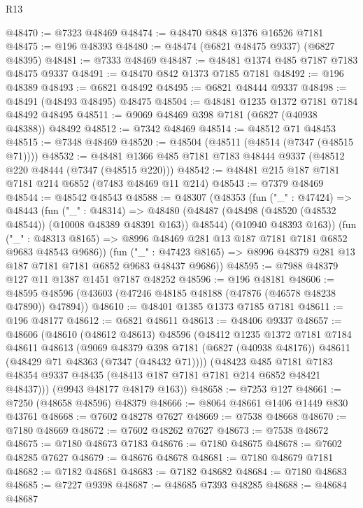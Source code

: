 \begin{lexlean}{R13}
\begin{coremodule}
@48470 := @7323 @48469
@48474 := @48470 @848 @1376 @16526 @7181
@48475 := @196 @48393
@48480 := @48474 (@6821 @48475 @9337) (@6827 @48395)
@48481 := @7333 @48469
@48487 := @48481 @1374 @485 @7187 @7183 @48475 @9337
@48491 := @48470 @842 @1373 @7185 @7181
@48492 := @196 @48389
@48493 := @6821 @48492
@48495 := @6821 @48444 @9337
@48498 := @48491 (@48493 @48495) @48475
@48504 := @48481 @1235 @1372 @7181 @7184 @48492 @48495
@48511 := @9069 @48469 @398 @7181 (@6827 (@40938 @48388)) @48492
@48512 := @7342 @48469
@48514 := @48512 @71 @48453
@48515 := @7348 @48469
@48520 := @48504 (@48511 (@48514 (@7347 (@48515 @71))))
@48532 := @48481 @1366 @485 @7181 @7183 @48444 @9337 (@48512 @220 @48444 (@7347 (@48515 @220)))
@48542 := @48481 @215 @187 @7181 @7181 @214 @6852 (@7483 @48469 @11 @214)
@48543 := @7379 @48469
@48544 := @48542 @48543
@48588 := @48307
    (@48353
      (fun ("_" : @47424) =>
      @48443
        (fun ("_" : @48314) =>
        @48480
          (@48487 (@48498 (@48520 (@48532 @48544)) (@10008 @48389 @48391 @163)) @48544)
          (@10940 @48393 @163))
        (fun ("_" : @48313 @8165) =>
        @8996 @48469 @281 @13 @187 @7181 @7181 @6852 @9683 @48543 @9686))
      (fun ("_" : @47423 @8165) => @8996 @48379 @281 @13 @187 @7181 @7181 @6852 @9683 @48437 @9686))
@48595 := @7988 @48379 @127 @11 @1387 @1451 @7187 @48252
@48596 := @196 @48181
@48606 := @48595 @48596 (@43603 (@47246 @48185 @48188 (@47876 (@46578 @48238 @47890)) @47894))
@48610 := @48401 @1385 @1373 @7185 @7181
@48611 := @196 @48177
@48612 := @6821 @48611
@48613 := @48406 @9337
@48657 := @48606
    (@48610
      (@48612 @48613)
      @48596
      (@48412
        @1235
        @1372
        @7181
        @7184
        @48611
        @48613
        (@9069
          @48379
          @398
          @7181
          (@6827 (@40938 @48176))
          @48611
          (@48429 @71 @48363 (@7347 (@48432 @71))))
        (@48423
          @485
          @7181
          @7183
          @48354
          @9337
          @48435
          (@48413 @187 @7181 @7181 @214 @6852 @48421 @48437)))
      (@9943 @48177 @48179 @163))
@48658 := @7253 @127
@48661 := @7250 (@48658 @48596) @48379
@48666 := @8064 @48661 @1406 @1449 @830 @43761
@48668 := @7602 @48278 @7627
@48669 := @7538 @48668
@48670 := @7180 @48669
@48672 := @7602 @48262 @7627
@48673 := @7538 @48672
@48675 := @7180 @48673 @7183
@48676 := @7180 @48675
@48678 := @7602 @48285 @7627
@48679 := @48676 @48678
@48681 := @7180 @48679 @7181
@48682 := @7182 @48681
@48683 := @7182 @48682
@48684 := @7180 @48683
@48685 := @7227 @9398
@48687 := @48685 @7393 @48285
@48688 := @48684 @48687

\end{coremodule}
\end{lexlean}
